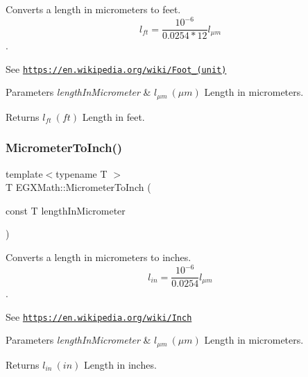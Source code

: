 Converts a length in micrometers to feet. \[ l_{ft}= \frac{10^{-6}}{0.0254 * 12} l_{\mu m} \]. 

See \href{https://en.wikipedia.org/wiki/Foot_(unit)}{\tt https\+://en.\+wikipedia.\+org/wiki/\+Foot\+\_\+(unit)} 
\begin{DoxyParams}{Parameters}
{\em length\+In\+Micrometer} & $ l_{\mu m}\ (\mu m)$ Length in micrometers. \\
\hline
\end{DoxyParams}
\begin{DoxyReturn}{Returns}
$ l_{ft}\ (ft)$ Length in feet. 
\end{DoxyReturn}
\mbox{\label{group___e_g_x_math-_conversions-_length_conversions-_micrometer-_imperial_gad372acac36a8ca7f56b26858dd01546b}} 
\subsubsection{\texorpdfstring{Micrometer\+To\+Inch()}{MicrometerToInch()}}
{\footnotesize\ttfamily template$<$typename T $>$ \\
T E\+G\+X\+Math\+::\+Micrometer\+To\+Inch (\begin{DoxyParamCaption}\item[{const T}]{length\+In\+Micrometer }\end{DoxyParamCaption})}



Converts a length in micrometers to inches. \[ l_{in}= \frac{10^{-6}}{0.0254} l_{\mu m} \]. 

See \href{https://en.wikipedia.org/wiki/Inch}{\tt https\+://en.\+wikipedia.\+org/wiki/\+Inch} 
\begin{DoxyParams}{Parameters}
{\em length\+In\+Micrometer} & $ l_{\mu m}\ (\mu m)$ Length in micrometers. \\
\hline
\end{DoxyParams}
\begin{DoxyReturn}{Returns}
$ l_{in}\ (in)$ Length in inches. 
\end{DoxyReturn}
\mbox{\label{group___e_g_x_math-_conversions-_length_conversions-_micrometer-_imperial_ga94d0f5a6ba598898a13e3a8837d7c681}} 
